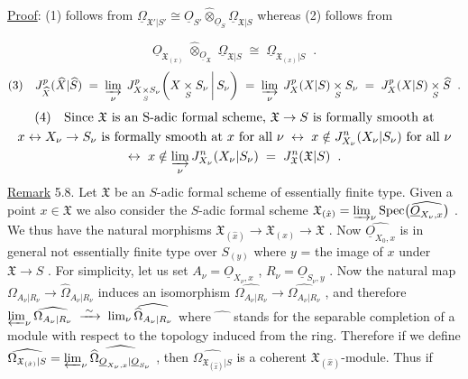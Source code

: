 \underline{Proof}: (1) follows from $\underline{\Omega}_{\mathfrak{X}'|S'} \cong \underline{O}_{S'} \widehat{\otimes}_{\underline{O}_S} \underline{\Omega}_{\mathfrak{X}|S}$ whereas (2) follows from

\begin{equation*}
\underline{O}_{\mathfrak{X}_{(x)}} \;\widehat{\otimes}_{\underline{O}_{\mathfrak{X}}}\; \underline{\Omega}_{\mathfrak{X}|S} \;\cong\; \underline{\Omega}_{\mathfrak{X}_{(x)}|S} \;\;.
\end{equation*}
\begin{equation*}
(3)\quad J^{p}_{\widehat{X}}(\widehat{X}|\widehat{S}) \;=\; \varinjlim_{\nu} \; J^{p}_{X \underset{S}{\times} S_\nu}\!\left(X \underset{S}{\times} S_\nu \,\middle|\, S_\nu\right) \;=\; \varinjlim_{\nu} \; J^{p}_{X}(X|S) \underset{S}{\times} S_\nu \;=\; J^{p}_{X}(X|S) \underset{S}{\times} \widehat{S} \;\;.
\end{equation*}
\begin{equation*}
\resizebox{\textwidth}{!}{$\begin{gathered}
(4)\quad \text{Since } \mathfrak{X} \text{ is an S-adic formal scheme, } \mathfrak{X} \to S \text{ is formally smooth at}\\ x \leftrightarrow X_\nu \to S_\nu \text{ is formally smooth at } x \text{ for all } \nu \;\leftrightarrow\; x \notin J^{n}_{X_\nu}(X_\nu|S_\nu) \text{ for all } \nu\\ \leftrightarrow\; x \notin \varinjlim_{\nu} J^{n}_{X_\nu}(X_\nu|S_\nu) \;=\; J^{n}_{\mathfrak{X}}(\mathfrak{X}|S) \;\;.
\end{gathered}$}
\end{equation*}
\underline{Remark} 5.8. Let $\mathfrak{X}$ be an $S$-adic formal scheme of essentially finite type. Given a point $x \in \mathfrak{X}$ we also consider the $S$-adic formal scheme $\mathfrak{X}_{(\hat{x})} = \varinjlim_{\nu} \mathrm{Spec}\big(\widehat{\underline{O}_{X_\nu,x}}\big)$ . We thus have the natural morphisms $\mathfrak{X}_{(\hat{x})} \to \mathfrak{X}_{(x)} \to \mathfrak{X}$ . Now $\widehat{\underline{O}_{X_0,x}}$ is in general not essentially finite type over $S_{(y)}$ where $y$ = the image of $x$ under $\mathfrak{X} \to S$ . For simplicity, let us set $A_\nu = \underline{O}_{X_\nu,x}$ , $R_\nu = \underline{O}_{S_\nu,y}$ . Now the natural map $\Omega_{A_\nu|R_\nu} \to \widehat{\Omega}_{A_\nu|R_\nu}$ induces an isomorphism $\widehat{\Omega_{A_\nu|R_\nu}} \to \widehat{\Omega_{A_\nu|R_\nu}}$ , and therefore $\varprojlim_{\nu} \widehat{\Omega_{A_\nu|R_\nu}} \;\xrightarrow{\;\sim\;}\; \lim_{\nu} \widehat{\widehat{\Omega}_{A_\nu|R_\nu}}$ where $\widehat{\phantom{xx}}$ stands for the separable completion of a module with respect to the topology induced from the ring. Therefore if we define $\widehat{\Omega_{\mathfrak{X}_{(\hat{x})}|S}} = \varprojlim_{\nu} \widehat{\widehat{\Omega}_{\underline{O}_{X_\nu,x}|\underline{O}_{S_\nu}}}$ , then $\widehat{\Omega_{\mathfrak{X}_{(\hat{x})}|S}}$ is a coherent $\mathfrak{X}_{(\hat{x})}$-module. Thus if
